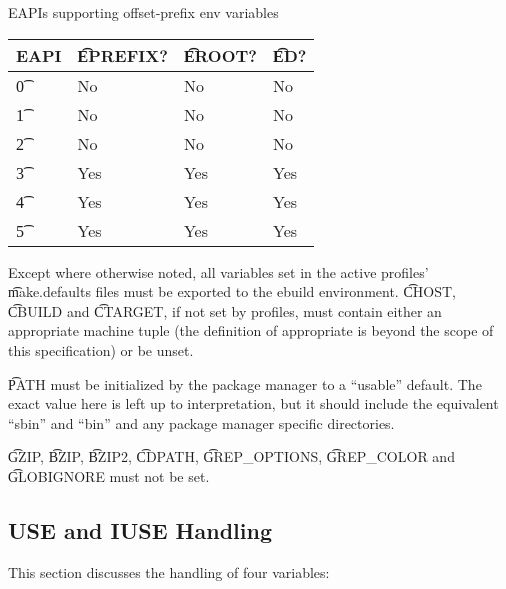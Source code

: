 \begin{centertable}{EAPIs supporting offset-prefix env variables}
    \label{tab:offset-env-vars-table}
    \begin{tabular}{ l l l l }
        \toprule
        \multicolumn{1}{c}{\textbf{EAPI}} &
        \multicolumn{1}{c}{\textbf{\t{EPREFIX}?}} &
        \multicolumn{1}{c}{\textbf{\t{EROOT}?}} &
        \multicolumn{1}{c}{\textbf{\t{ED}?}} \\
        \midrule
        \t{0} & No & No & No \\
        \t{1} & No & No & No \\
        \t{2} & No & No & No \\
        \t{3} & Yes & Yes & Yes \\
        \t{4} & Yes & Yes & Yes \\
        \t{5} & Yes & Yes & Yes \\
        \bottomrule
    \end{tabular}
\end{centertable}

Except where otherwise noted, all variables set in the active profiles' \t{make.defaults} files must
be exported to the ebuild environment. \t{CHOST}, \t{CBUILD} and \t{CTARGET}, if not set by
profiles, must contain either an appropriate machine tuple (the definition of appropriate is beyond
the scope of this specification) or be unset.

\t{PATH} must be initialized by the package manager to a ``usable'' default.  The exact value here
is left up to interpretation, but it should include the equivalent ``sbin'' and ``bin'' and any
package manager specific directories.

\t{GZIP}, \t{BZIP}, \t{BZIP2}, \t{CDPATH}, \t{GREP\_OPTIONS}, \t{GREP\_COLOR} and \t{GLOBIGNORE}
must not be set.

\subsection{USE and IUSE Handling}
\label{sec:use-iuse-handling}

This section discusses the handling of four variables:

